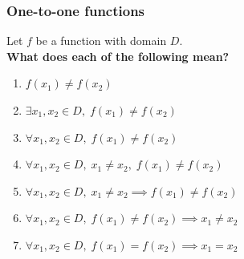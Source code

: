 \documentclass[14pt]{beamer}
\begin{document}
\begin{frame}
	\frametitle{One-to-one functions}

	Let $f$ be a function with domain $D$. \\ {\bfseries What does each of the following mean?}
	\begin{enumerate}
		\item $\displaystyle f(x_{1}) \neq f(x_{2})$

		\item $\displaystyle \exists x_{1}, x_{2}\in D, \; f(x_{1}) \neq f(x_{2})$

		\item $\displaystyle \forall x_{1}, x_{2}\in D, \; f(x_{1}) \neq f(x_{2})$

		\item $\displaystyle \forall x_{1}, x_{2}\in D, \; x_{1}\neq x_{2}, \; f(x_{1}
			) \neq f(x_{2})$

		\item $\displaystyle \forall x_{1}, x_{2}\in D, \; x_{1}\neq x_{2}\implies f(
			x_{1}) \neq f(x_{2})$

		\item $\displaystyle \forall x_{1}, x_{2}\in D, \; f(x_{1}) \neq f(x_{2}) \implies
			x_{1}\neq x_{2}$

		\item $\displaystyle \forall x_{1}, x_{2}\in D, \; f(x_{1}) = f(x_{2}) \implies
			x_{1}= x_{2}$
	\end{enumerate}
\end{frame}
\end{document}

